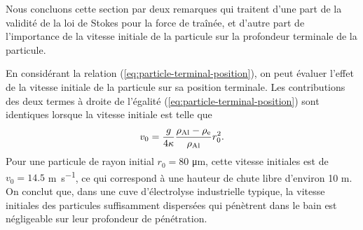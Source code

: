 Nous concluons cette section par deux remarques qui traitent d'une
part de la validité de la loi de Stokes pour la force de traînée, et
d'autre part de l'importance de la vitesse initiale de la particule
sur la profondeur terminale de la particule.



\begin{remarque}
  En considérant la relation (\ref{eq:particle-terminal-position}), on
  peut évaluer l'effet de la vitesse initiale de la particule sur sa
  position terminale. Les contributions des deux termes à droite de
  l'égalité (\ref{eq:particle-terminal-position}) sont identiques
  lorsque la vitesse initiale est telle que
  \begin{equation}
    v_0 = \frac{g}{4\kappa}\frac{\rho_\mathrm{Al} -
      \rho_\mathrm{e}}{\rho_\mathrm{Al}} r_0^2.
  \end{equation}
  Pour une particule de rayon initial $r_0 = \num{80}$
  \si{\micro\meter}, cette vitesse initiales est de $v_0 = \num{14.5}$
  \si{\meter\per\second}, ce qui correspond à une hauteur de chute
  libre d'environ \num{10} \si{\meter}. On conclut que, dans une cuve
  d'électrolyse industrielle typique, la vitesse initiales des
  particules suffisamment dispersées qui pénètrent dans le bain est
  négligeable sur leur profondeur de pénétration.
\end{remarque}

